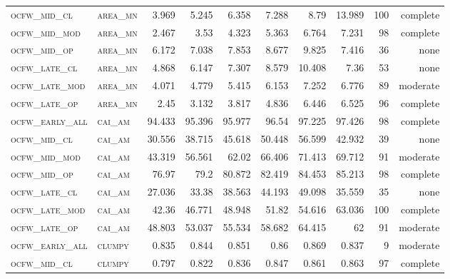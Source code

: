 \begin{landscape}
\begin{center}
\begin{footnotesize}
\begin{longtable}{llrrrrr|rrr}
\textsc{ocfw\_mid\_cl   } & \textsc{area\_mn  }    & 3.969    & 5.245    & 6.358    & 7.288    & 8.79     & 13.989   & 100 & complete \\
\textsc{ocfw\_mid\_mod  } & \textsc{area\_mn  }    & 2.467    & 3.53     & 4.323    & 5.363    & 6.764    & 7.231    & 98  & complete \\
\textsc{ocfw\_mid\_op   } & \textsc{area\_mn  }    & 6.172    & 7.038    & 7.853    & 8.677    & 9.825    & 7.416    & 36  & none     \\
\textsc{ocfw\_late\_cl  } & \textsc{area\_mn  }    & 4.868    & 6.147    & 7.307    & 8.579    & 10.408   & 7.36     & 53  & none     \\
\textsc{ocfw\_late\_mod } & \textsc{area\_mn  }    & 4.071    & 4.779    & 5.415    & 6.153    & 7.252    & 6.776    & 89  & moderate \\
\textsc{ocfw\_late\_op  } & \textsc{area\_mn  }    & 2.45     & 3.132    & 3.817    & 4.836    & 6.446    & 6.525    & 96  & complete \\
\textsc{ocfw\_early\_all} & \textsc{cai\_am   }    & 94.433   & 95.396   & 95.977   & 96.54    & 97.225   & 97.426   & 98  & complete \\
\textsc{ocfw\_mid\_cl   } & \textsc{cai\_am   }    & 30.556   & 38.715   & 45.618   & 50.448   & 56.599   & 42.932   & 39  & none     \\
\textsc{ocfw\_mid\_mod  } & \textsc{cai\_am   }    & 43.319   & 56.561   & 62.02    & 66.406   & 71.413   & 69.712   & 91  & moderate \\
\textsc{ocfw\_mid\_op   } & \textsc{cai\_am   }    & 76.97    & 79.2     & 80.872   & 82.419   & 84.453   & 85.213   & 98  & complete \\
\textsc{ocfw\_late\_cl  } & \textsc{cai\_am   }    & 27.036   & 33.38    & 38.563   & 44.193   & 49.098   & 35.559   & 35  & none     \\
\textsc{ocfw\_late\_mod } & \textsc{cai\_am   }    & 42.36    & 46.771   & 48.948   & 51.82    & 54.616   & 63.036   & 100 & complete \\
\textsc{ocfw\_late\_op  } & \textsc{cai\_am   }    & 48.803   & 53.037   & 55.534   & 58.682   & 64.415   & 62       & 91  & moderate \\
\textsc{ocfw\_early\_all} & \textsc{clumpy    }    & 0.835    & 0.844    & 0.851    & 0.86     & 0.869    & 0.837    & 9   & moderate \\
\textsc{ocfw\_mid\_cl   } & \textsc{clumpy    }    & 0.797    & 0.822    & 0.836    & 0.847    & 0.861    & 0.863    & 97  & complete \\

\end{longtable}
\end{footnotesize}
\end{center}
\end{landscape}
